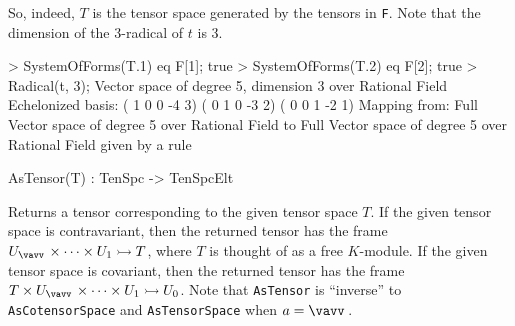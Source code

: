 \begin{example}[TensorsToSpaces]
So, indeed, $T$ is the tensor space generated by the tensors in \texttt{F}. 
Note that the dimension of the 3-radical of $t$ is 3.
\begin{code}
> SystemOfForms(T.1) eq F[1];
true
> SystemOfForms(T.2) eq F[2];
true
> Radical(t, 3);
Vector space of degree 5, dimension 3 over Rational Field
Echelonized basis:
( 1  0  0 -4  3)
( 0  1  0 -3  2)
( 0  0  1 -2  1)
Mapping from: Full Vector space of degree 5 over Rational Field to Full 
Vector space of degree 5 over Rational Field given by a rule
\end{code}
\end{example}

\begin{intrinsics}
AsTensor(T) : TenSpc -> TenSpcElt
\end{intrinsics}

Returns a tensor corresponding to the given tensor space $T$. 
If the given tensor space is contravariant, then the returned tensor has the frame $U_{\vav}\times \cdots \times U_1\rightarrowtail T$, where $T$ is thought of as a free $K$-module.
If the given tensor space is covariant, then the returned tensor has the frame $T\times U_{\vav}\times \cdots \times U_1\rightarrowtail U_0$.
Note that \texttt{AsTensor} is ``inverse'' to \texttt{AsCotensorSpace} and \texttt{AsTensorSpace} when $a=\vav$.


